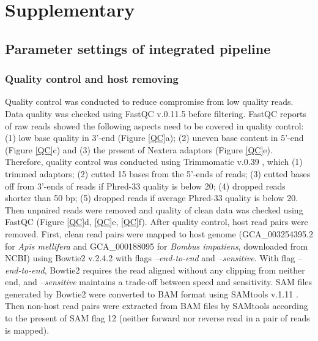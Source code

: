 \documentclass[11pt]{article}
\begin{document}
\newcommand{\beginsupplement}{%
        \setcounter{table}{0}
        \renewcommand{\thetable}{S\arabic{table}}%
        \setcounter{figure}{0}
        \renewcommand{\thefigure}{S\arabic{figure}}%
     }
\section{Supplementary}
  \beginsupplement
  \subsection{Parameter settings of integrated pipeline}
  \label{ParameterSetting}
    \subsubsection{Quality control and host removing}
    \label{HostRemove}
    Quality control was conducted to reduce compromise from low quality reads.
    Data quality was checked using FastQC v.0.11.5 \citep{andrews2010fastqc} before filtering. 
    FastQC reports of raw reads showed the following aspects need to be covered in quality control: (1) low base quality in 3'-end (Figure \ref{QC}a); (2) uneven base content in 5'-end (Figure \ref{QC}c) and (3) the present of Nextera adaptors (Figure \ref{QC}e). 
    Therefore, quality control was conducted using Trimmomatic v.0.39 \citep{bolger2014trimmomatic}, which (1) trimmed adaptors; (2) cutted 15 bases from the 5'-ends of reads; (3) cutted bases off from 3'-ends of reads if Phred-33 quality is below 20; (4) dropped reads shorter than 50 bp; (5) dropped reads if average Phred-33 quality is below 20. 
    Then unpaired reads were removed and quality of clean data was checked using FastQC (Figure \ref{QC}d, \ref{QC}e, \ref{QC}f).
    \newline  
    After quality control, host read pairs were removed. 
    First, clean read pairs were mapped to host genome (GCA\_003254395.2 for \textit{Apis mellifera} and GCA\_000188095 for \textit{Bombus impatiens}, downloaded from NCBI) using Bowtie2 v.2.4.2 \citep{langmead2012fast} with flags \textit{--end-to-end} and \textit{--sensitive}. 
    With flag \textit{--end-to-end}, Bowtie2 requires the read aligned without any clipping from neither end, and \textit{--sensitive} maintains a trade-off between speed and sensitivity. 
    SAM files generated by Bowtie2 were converted to BAM format using SAMtools v.1.11 \citep{li2009sequence}. 
    Then non-host read pairs were extracted from BAM files by SAMtools according to the present of SAM flag 12 (neither forward nor reverse read in a pair of reads is mapped).
\end{document}
